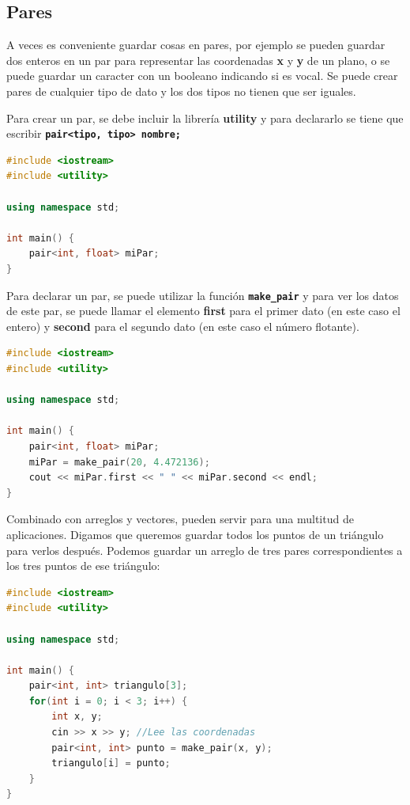 \documentclass{article}
\begin{document}
\subsection{Pares}

A veces es conveniente guardar cosas en pares, por ejemplo se pueden guardar dos enteros en un par para representar las coordenadas \textbf{x} y \textbf{y} de un plano, o se puede guardar un caracter con un booleano indicando si es vocal. Se puede crear pares de cualquier tipo de dato y los dos tipos no tienen que ser iguales.

Para crear un par, se debe incluir la librería \textbf{utility} y para declararlo se tiene que escribir \textbf{\lstinline{pair<tipo, tipo> nombre;}}

\begin{lstlisting}[language=C++, caption=Declarando pares]
#include <iostream>
#include <utility>

using namespace std;

int main() {
    pair<int, float> miPar;
}
\end{lstlisting}

Para declarar un par, se puede utilizar la función \textbf{\lstinline{make_pair}} y para ver los datos de este par, se puede llamar el elemento \textbf{first} para el primer dato (en este caso el entero) y \textbf{second} para el segundo dato (en este caso el número flotante).

\begin{lstlisting}[language=C++, caption=Declarando pares]
#include <iostream>
#include <utility>

using namespace std;

int main() {
    pair<int, float> miPar;
    miPar = make_pair(20, 4.472136);
    cout << miPar.first << " " << miPar.second << endl;
}
\end{lstlisting}

Combinado con arreglos y vectores, pueden servir para una multitud de aplicaciones. Digamos que queremos guardar todos los puntos de un triángulo para verlos después. Podemos guardar un arreglo de tres pares correspondientes a los tres puntos de ese triángulo:

\begin{lstlisting}[language=C++, caption=Arreglo de pares]
#include <iostream>
#include <utility>

using namespace std;

int main() {
    pair<int, int> triangulo[3];
    for(int i = 0; i < 3; i++) {
        int x, y;
        cin >> x >> y; //Lee las coordenadas
        pair<int, int> punto = make_pair(x, y);
        triangulo[i] = punto;
    }
}
\end{lstlisting}
\end{document}
